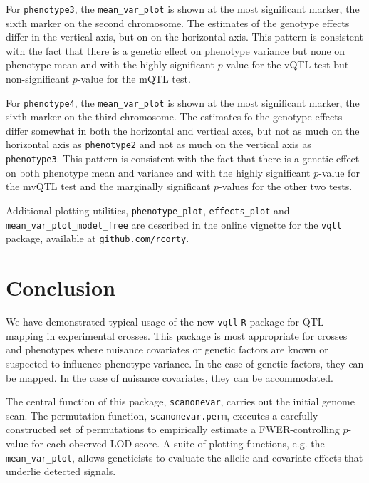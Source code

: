 \documentclass{article}
\begin{document}
For \texttt{phenotype3}, the \texttt{mean\_var\_plot} is shown at the most significant marker, the sixth marker on the second chromosome.
The estimates of the genotype effects differ in the vertical axis, but on on the horizontal axis.
This pattern is consistent with the fact that there is a genetic effect on phenotype variance but none on phenotype mean and with the highly significant $p$-value for the vQTL test but non-significant $p$-value for the mQTL test.

For \texttt{phenotype4}, the \texttt{mean\_var\_plot} is shown at the most significant marker, the sixth marker on the third chromosome.
The estimates fo the genotype effects differ somewhat in both the horizontal and vertical axes, but not as much on the horizontal axis as \texttt{phenotype2} and not as much on the vertical axis as \texttt{phenotype3}.
This pattern is consistent with the fact that there is a genetic effect on both phenotype mean and variance and with the highly significant $p$-value for the mvQTL test and the marginally significant $p$-values for the other two tests.

Additional plotting utilities, \texttt{phenotype\_plot}, \texttt{effects\_plot} and \texttt{mean\_var\_plot\_model\_free} are described in the online vignette for the \texttt{vqtl} package, available at \texttt{github.com/rcorty}.






\section*{Conclusion}

We have demonstrated typical usage of the new \texttt{vqtl} \texttt{R} package for QTL mapping in experimental crosses.
This package is most appropriate for crosses and phenotypes where nuisance covariates or genetic factors are known or suspected to influence phenotype variance.
In the case of genetic factors, they can be mapped.
In the case of nuisance covariates, they can be accommodated.

The central function of this package, \texttt{scanonevar}, carries out the initial genome scan.
The permutation function, \texttt{scanonevar.perm}, executes a carefully-constructed set of permutations to empirically estimate a FWER-controlling $p$-value for each observed LOD score.
A suite of plotting functions, e.g. the \texttt{mean\_var\_plot}, allows geneticists to evaluate the allelic and covariate effects that underlie detected signals.
\end{document}
